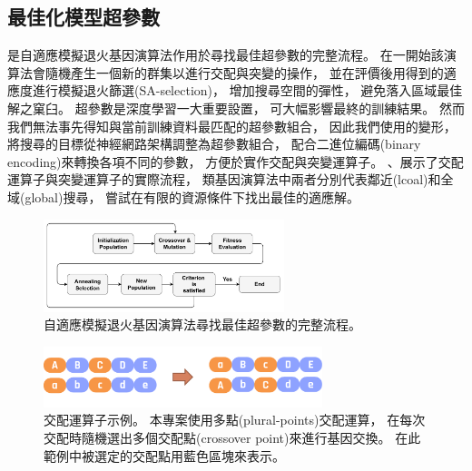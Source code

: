 \documentclass[a4paper,12pt]{extarticle}
\begin{document}
        \subsection{最佳化模型超參數}
            是自適應模擬退火基因演算法作用於尋找最佳超參數的完整流程。
            在一開始該演算法會隨機產生一個新的群集以進行交配與突變的操作，
            並在評價後用得到的適應度進行模擬退火篩選(SA-selection)，
            增加搜尋空間的彈性，
            避免落入區域最佳解之窠臼。
            超參數是深度學習一大重要設置，
            可大幅影響最終的訓練結果。
            然而我們無法事先得知與當前訓練資料最匹配的超參數組合，
            因此我們使用的變形，
            將搜尋的目標從神經網路架構調整為超參數組合，
            配合二進位編碼(binary encoding)來轉換各項不同的參數，
            方便於實作交配與突變運算子。
            、展示了交配運算子與突變運算子的實際流程，
            類基因演算法中兩者分別代表鄰近(lcoal)和全域(global)搜尋，
            嘗試在有限的資源條件下找出最佳的適應解。
            \begin{figure}[htb]
                \centering
                \includegraphics[width=0.625\textwidth]{SAGA_scheme.pdf}
                \caption{
                    自適應模擬退火基因演算法尋找最佳超參數的完整流程。
                }
                \label{fig:SAGA_scheme}
            \end{figure}
            \begin{figure}[htb]
                \centering
                \includegraphics[width=0.725\textwidth]{crossover.pdf}
                \caption{
                    交配運算子示例。
                    本專案使用多點(plural-points)交配運算，
                    在每次交配時隨機選出多個交配點(crossover point)來進行基因交換。
                    在此範例中被選定的交配點用藍色區塊來表示。
                }
                \label{fig:crossover}
            \end{figure}
\end{document}
